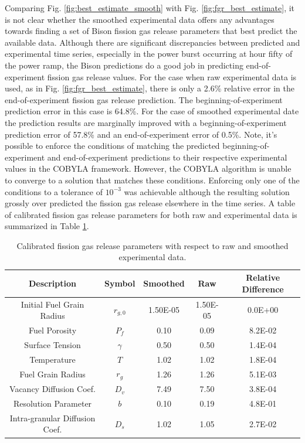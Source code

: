 Comparing Fig. \ref{fig:best_estimate_smooth} with  Fig. \ref{fig:fgr_best_estimate}, it is not clear whether the smoothed experimental data offers any advantages towards finding a set of Bison fission gas release parameters that best predict the available data. Although there are significant discrepancies between predicted and experimental time series, especially in the power burst occurring at hour fifty of the power ramp, the Bison predictions do a good job in predicting end-of-experiment fission gas release values. For the case when raw experimental data is used, as in Fig. \ref{fig:fgr_best_estimate}, there is only a 2.6\% relative error in the end-of-experiment fission gas release prediction. The beginning-of-experiment prediction error in this case is 64.8\%. For the case of smoothed experimental date the prediction results are marginally improved with a beginning-of-experiment prediction error of 57.8\% and an end-of-experiment error of 0.5\%. Note, it's possible to enforce the conditions of matching the predicted beginning-of-experiment and end-of-experiment predictions to their respective experimental values in the \ac{COBYLA} framework. However, the \ac{COBYLA} algorithm is unable to converge to a solution that matches these conditions. Enforcing only one of the conditions to a tolerance of $10^{-3}$ was achievable although the resulting solution grossly over predicted the fission gas release elsewhere in the time series. A table of calibrated fission gas release parameters for both raw and experimental data is summarized in Table \ref{table:optimal_fgr_paramaters}.        
\begin{table}[!h] 
\caption{Calibrated fission gas release parameters with respect to raw and smoothed experimental data.}
\label{table:optimal_fgr_paramaters} 
\centering
\begin{tabular}{||c|c|c|c|c||} 
\hline \hline
\textbf{Description} & \textbf{Symbol} & \textbf{Smoothed} & \textbf{Raw} & \textbf{Relative Difference} \\ \hline
Initial Fuel Grain Radius & $r_{g,0}$  & 1.50E-05 & 1.50E-05 & 0.0E+00 \\ \hline
Fuel Porosity               & $P_f$      & 0.10      & 0.09      & 8.2E-02 \\ \hline
Surface Tension           & $\gamma$  & 0.50     & 0.50      & 1.4E-04 \\ \hline
Temperature               & $T$          & 1.02   & 1.02     & 1.8E-04 \\ \hline
Fuel Grain Radius         & $r_g$       & 1.26     & 1.26      & 5.1E-03 \\ \hline
Vacancy Diffusion Coef.  & $D_v$      & 7.49      & 7.50     & 3.8E-04 \\ \hline
Resolution Parameter    & $b$         & 0.10      & 0.19     & 4.8E-01 \\ \hline
Intra-granular Diffusion Coef. & $D_s$ & 1.02 & 1.05   & 2.7E-02 \\ 
\hline \hline
\end{tabular}
\end{table}







 



   



    






   

